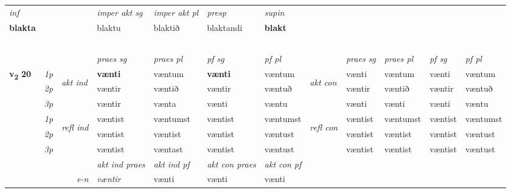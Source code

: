 \begin{longtable}[l]{X>{\footnotesize\itshape}llXXXXlXXXX}
   {\textit{inf}} & &  & \textit{imper akt sg} & \textit{imper akt pl}   & \textit{presp} & \textit{supin}   \\*
  {\textbf{blakta}} & && blaktu  & blaktið   & blaktandi &  \textbf{blakt}   \\*

\midrule
  & \\*
   & \\*
    & \\*
     & \\*
  & \\
   \midrule

 & &   & \textit{praes sg}  & \textit{praes pl}    & \textit{ pf sg} & \textit{pf pl} & & \textit{praes sg}  & \textit{praes pl}    & \textit{pf sg} & \textit{pf pl }  \\ \cmidrule{4-7} \cmidrule{9-12}
 \multirow{2}{*}{{{\textbf{v{\textsubscript{2}}} \Large{\textbf{20}}}}}  & 1p & \multirow{3}{*}{\begin{turn}{90}\textit{akt ind}\end{turn}} & \textbf{vænti} & væntum & \textbf{vænti} & væntum & \multirow{3}{*}{\begin{turn}{90}\textit{akt con}\end{turn}} &vænti & væntum & vænti & væntum\\*
 & 2p &  &  væntir  & væntið & væntir & væntuð & & væntir & væntið & væntir & væntuð \\*
 & 3p &  & væntir & vænta & vænti & væntu & & vænti & vænti& vænti & væntu \\*
\cmidrule{4-7} \cmidrule{9-12}
 & 1p & \multirow{3}{*}{\begin{turn}{90}\textit{refl ind}\end{turn}}  & væntist & væntumst & væntist & væntumst & \multirow{3}{*}{\begin{turn}{90}\textit{refl con}\end{turn}}  &væntist & væntumst & væntist & væntumst \\*
 & 2p &  & væntist & væntist & væntist & væntust & &væntist & væntist & væntist & væntust \\*
 & 3p  & & væntist & væntast & væntist & væntust & & væntist & væntist& væntist & væntust \\*
\cmidrule{4-7} \cmidrule{9-12}

   && &  \textit{akt ind praes} & \textit{akt ind pf} & \textit{akt con praes} & \textit{akt con pf} \\*
\multicolumn{3}{r}{\textit{e-n}} & væntir & vænti & vænti & vænti \\*


\end{longtable}
